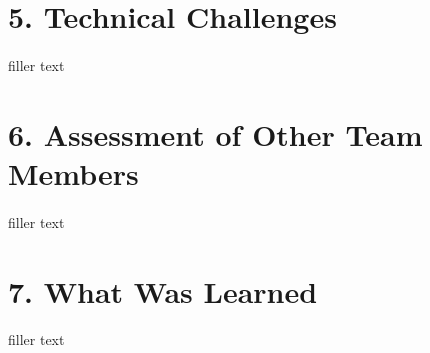 \documentclass[letterpaper]{article}
\begin{document}
\section*{5. Technical Challenges}

\paragraph*{}
    filler text

\section*{6. Assessment of Other Team Members}

\paragraph*{}
    filler text
\section*{7. What Was Learned}

\paragraph*{}
    filler text
\end{document}
